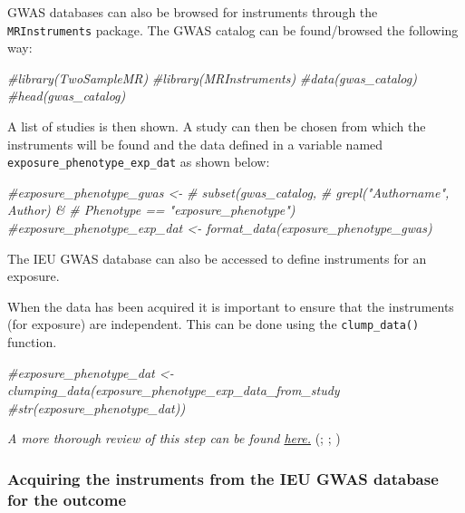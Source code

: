 \documentclass[
]{article}
\newenvironment{Shaded}{\begin{snugshade}}{\end{snugshade}}
\newcommand{\CommentTok}[1]{\textcolor[rgb]{0.56,0.35,0.01}{\textit{#1}}}
\begin{document}
GWAS databases can also be browsed for instruments through the
\texttt{MRInstruments} package. The GWAS catalog can be found/browsed
the following way:

\begin{Shaded}
\begin{Highlighting}[]
\CommentTok{\#library(TwoSampleMR)}
\CommentTok{\#library(MRInstruments)}
\CommentTok{\#data(gwas\_catalog)}
\CommentTok{\#head(gwas\_catalog)}
\end{Highlighting}
\end{Shaded}

A list of studies is then shown. A study can then be chosen from which
the instruments will be found and the data defined in a variable named
\texttt{exposure\_phenotype\_exp\_dat} as shown below:

\begin{Shaded}
\begin{Highlighting}[]
\CommentTok{\#exposure\_phenotype\_gwas \textless{}{-}}
\CommentTok{\#   subset(gwas\_catalog,}
\CommentTok{\#          grepl("Authorname", Author) \&}
\CommentTok{\#            Phenotype == "exposure\_phenotype") }
\CommentTok{\#exposure\_phenotype\_exp\_dat \textless{}{-} format\_data(exposure\_phenotype\_gwas)}
\end{Highlighting}
\end{Shaded}

The IEU GWAS database can also be accessed to define instruments for an
exposure.

When the data has been acquired it is important to ensure that the
instruments (for exposure) are independent. This can be done using the
\texttt{clump\_data()} function.

\begin{Shaded}
\begin{Highlighting}[]
\CommentTok{\#exposure\_phenotype\_dat \textless{}{-} clumping\_data(exposure\_phenotype\_exp\_data\_from\_study}
\CommentTok{\#str(exposure\_phenotype\_dat))}
\end{Highlighting}
\end{Shaded}

\emph{A more thorough review of this step can be found
\href{https://mrcieu.github.io/TwoSampleMR/articles/exposure.html}{here.}}
(;
;
)

\subsubsection{Acquiring the instruments from the IEU GWAS database for
the
outcome}\label{acquiring-the-instruments-from-the-ieu-gwas-database-for-the-outcome}
\end{document}
